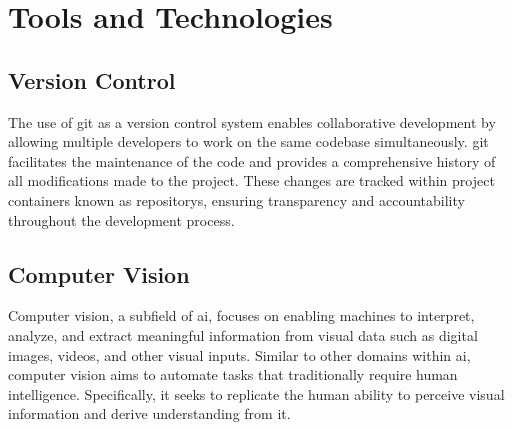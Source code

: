 

\section{Tools and Technologies}

\subsection{Version Control}

The use of \gls{git} as a version control system enables collaborative development by allowing multiple developers to work on the same codebase simultaneously. \gls{git} facilitates the maintenance of the code and provides a comprehensive history of all modifications made to the project. These changes are tracked within project containers known as \glspl{repository}, ensuring transparency and accountability throughout the development process. \cite{alphaefficiency:git}

\subsection{Computer Vision}

Computer vision, a subfield of \gls{ai}, focuses on enabling machines to interpret, analyze, and extract meaningful information from visual data such as digital images, videos, and other visual inputs. \cite{google:vision} Similar to other domains within \gls{ai}, computer vision aims to automate tasks that traditionally require human intelligence. Specifically, it seeks to replicate the human ability to perceive visual information and derive understanding from it. \cite{microsoft:vision}

